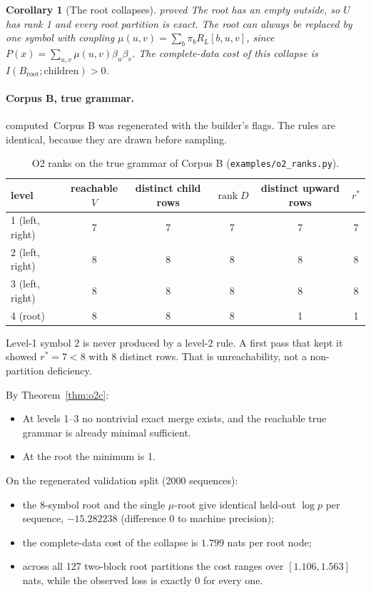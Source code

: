 \documentclass[11pt]{article}
\newtheorem{corollary}[theorem]{Corollary}
\theoremstyle{definition}
\theoremstyle{remark}
\newcommand{\st}[1]{\textsf{\small\color{gray}#1}}
\begin{document}
\begin{corollary}[The root collapses]\st{proved}
The root has an empty outside, so $U$ has rank 1 and every root partition is exact. The root can always be replaced by one symbol with coupling $\mu(u,v)=\sum_b\pi_bR_L[b,u,v]$, since $P(x)=\sum_{u,v}\mu(u,v)\beta_u\beta_v$. The complete-data cost of this collapse is $I(B_{\mathrm{root}};\text{children})>0$.
\end{corollary}

\paragraph{Corpus B, true grammar.}\st{computed}\ Corpus B was regenerated with the builder's flags. The rules are identical, because they are drawn before sampling.
\begin{table}[h]\centering\small
\begin{tabular}{lccccc}
\toprule
level & reachable $V$ & distinct child rows & $\operatorname{rank}D$ & distinct upward rows & $r^*$\\
\midrule
1 (left, right) & 7 & 7 & 7 & 7 & 7\\
2 (left, right) & 8 & 8 & 8 & 8 & 8\\
3 (left, right) & 8 & 8 & 8 & 8 & 8\\
4 (root) & 8 & 8 & 8 & 1 & 1\\
\bottomrule
\end{tabular}
\caption{O2 ranks on the true grammar of Corpus B (\texttt{examples/o2\_ranks.py}).}
\end{table}

\noindent Level-1 symbol 2 is never produced by a level-2 rule. A first pass that kept it showed $r^*=7<8$ with 8 distinct rows. That is unreachability, not a non-partition deficiency.

By Theorem~\ref{thm:o2c}:
\begin{itemize}
  \item At levels 1--3 no nontrivial exact merge exists, and the reachable true grammar is already minimal sufficient.
  \item At the root the minimum is 1.
\end{itemize}

\noindent On the regenerated validation split (2000 sequences):
\begin{itemize}
  \item the 8-symbol root and the single $\mu$-root give identical held-out $\log p$ per sequence, $-15.282238$ (difference $0$ to machine precision);
  \item the complete-data cost of the collapse is $1.799$ nats per root node;
  \item across all 127 two-block root partitions the cost ranges over $[1.106,1.563]$ nats, while the observed loss is exactly $0$ for every one.
\end{itemize}
\end{document}
